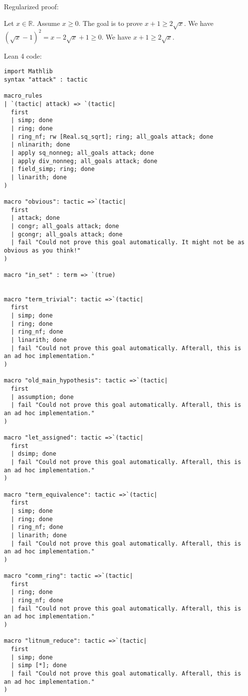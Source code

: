 \documentclass{article}
\begin{document}
Regularized proof:
\begin{tcolorbox}[colback=red!10, width=\linewidth]
Let $x\in\mathbb{R}$.
Assume $x\ge 0$.
The goal is to prove $x+1 \ge 2\sqrt{x}$.
We have ${(\sqrt{x}-1)}^2 = x - 2\sqrt{x} + 1 \ge 0$.
We have $x+1 \ge 2\sqrt{x}$.
\end{tcolorbox}

Lean 4 code:
\begin{tcolorbox}[colback=white!10, width=\linewidth]
\begin{lstlisting}[language=Lean4]
import Mathlib
syntax "attack" : tactic

macro_rules
| `(tactic| attack) => `(tactic|
  first
  | simp; done
  | ring; done
  | ring_nf; rw [Real.sq_sqrt]; ring; all_goals attack; done
  | nlinarith; done
  | apply sq_nonneg; all_goals attack; done
  | apply div_nonneg; all_goals attack; done
  | field_simp; ring; done
  | linarith; done
)

macro "obvious": tactic =>`(tactic|
  first
  | attack; done
  | congr; all_goals attack; done
  | gcongr; all_goals attack; done
  | fail "Could not prove this goal automatically. It might not be as obvious as you think!"
)

macro "in_set" : term => `(true)


macro "term_trivial": tactic =>`(tactic|
  first
  | simp; done
  | ring; done
  | ring_nf; done
  | linarith; done
  | fail "Could not prove this goal automatically. Afterall, this is an ad hoc implementation."
)

macro "old_main_hypothesis": tactic =>`(tactic|
  first
  | assumption; done
  | fail "Could not prove this goal automatically. Afterall, this is an ad hoc implementation."
)

macro "let_assigned": tactic =>`(tactic|
  first
  | dsimp; done
  | fail "Could not prove this goal automatically. Afterall, this is an ad hoc implementation."
)

macro "term_equivalence": tactic =>`(tactic|
  first
  | simp; done
  | ring; done
  | ring_nf; done
  | linarith; done
  | fail "Could not prove this goal automatically. Afterall, this is an ad hoc implementation."
)

macro "comm_ring": tactic =>`(tactic|
  first
  | ring; done
  | ring_nf; done
  | fail "Could not prove this goal automatically. Afterall, this is an ad hoc implementation."
)

macro "litnum_reduce": tactic =>`(tactic|
  first
  | simp; done
  | simp [*]; done
  | fail "Could not prove this goal automatically. Afterall, this is an ad hoc implementation."
)


\end{lstlisting}
\end{tcolorbox}
\end{document}
